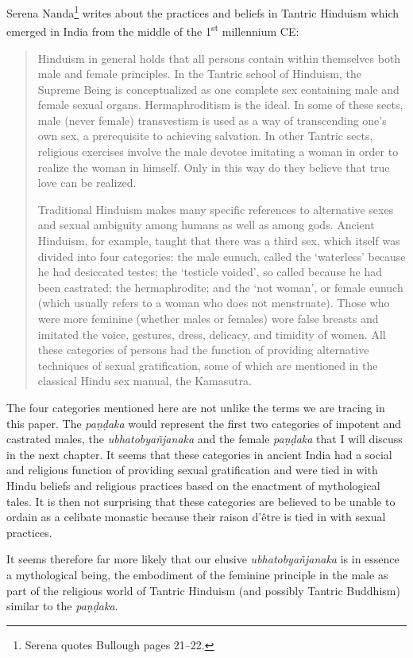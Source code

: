 Serena Nanda\footnote{Serena \cite{nanda} quotes Bullough pages 21–22.} writes about the practices and beliefs in Tantric Hinduism which emerged in India from the middle of the 1\textsuperscript{st} millennium CE:

\begin{quote}
Hinduism in general holds that all persons contain within themselves both male and female principles. In the Tantric school of Hinduism, the Supreme Being is conceptualized as one complete sex containing male and female sexual organs. Hermaphroditism is the ideal. In some of these sects, male (never female) transvestism is used as a way of transcending one's own sex, a prerequisite to achieving salvation. In other Tantric sects, religious exercises involve the male devotee imitating a woman in order to realize the woman in himself. Only in this way do they believe that true love can be realized. 

Traditional Hinduism makes many specific references to alternative sexes and sexual ambiguity among humans as well as among gods. Ancient Hinduism, for example, taught that there was a third sex, which itself was divided into four categories: the male eunuch, called the `waterless' because he had desiccated testes; the `testicle voided', so called because he had been castrated; the hermaphrodite; and the `not woman', or female eunuch (which usually refers to a woman who does not menstruate). Those who were more feminine (whether males or females) wore false breasts and imitated the voice, gestures, dress, delicacy, and timidity of women. All these categories of persons had the function of providing alternative techniques of sexual gratification, some of which are mentioned in the classical Hindu sex manual, the Kamasutra.
\end{quote}

The four categories mentioned here are not unlike the terms we are tracing in this paper. The {\em paṇḍaka} would represent the first two categories of impotent and castrated males, the {\em ubhatob­yañ­janaka} and the female {\em paṇḍaka} that I will discuss in the next chapter. It seems that these categories in ancient India had a social and religious function of providing sexual gratification and were tied in with Hindu beliefs and religious practices based on the enactment of mythological tales. It is then not surprising that these categories are believed to be unable to ordain as a celibate monastic because their raison d'être is tied in with sexual practices.

It seems therefore far more likely that our elusive {\em ubhatob­yañ­janaka} is in essence a mythological being, the embodiment of the feminine principle in the male as part of the religious world of Tantric Hinduism (and possibly Tantric Buddhism) similar to the {\em paṇḍaka}.

